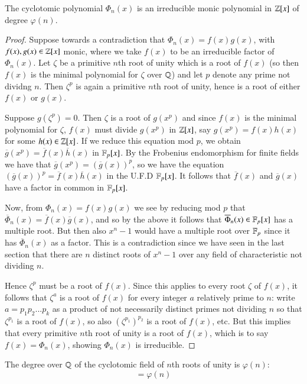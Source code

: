 \begin{theorem}
    The cyclotomic polynomial $\Phi_n(x)$ is an irreducible monic polynomial in $\mathbb Z[x]$ of degree $\varphi(n)$.
\end{theorem}
\begin{proof}
    Suppose towards a contradiction that $\Phi_n(x) = f(x)g(x)$, with $f(x),g(x) \in \mathbb Z[x]$ monic, where we take $f(x)$ to be an irreducible factor of $\Phi_n(x)$. Let $\zeta$ be a primitive $n$th root of unity which is a root of $f(x)$ (so then $f(x)$ is the minimal polynomial for $\zeta$ over $\mathbb Q$) and let $p$ denote any prime not dividng $n$. Then $\zeta^p$ is again a primitive $n$th root of unity, hence is a root of either $f(x)$ or $g(x)$.


    Suppose $g(\zeta^p) = 0$. Then $\zeta$ is a root of $g(x^p)$ and since $f(x)$ is the minimal polynomial for $\zeta$, $f(x)$ must divide $g(x^p)$ in $\mathbb Z[x]$, say $g(x^p) = f(x)h(x)$ for some $h(x) \in \mathbb Z[x]$. If we reduce this equation mod $p$, we obtain $\overline{g}(x^p) = \overline{f}(x)\overline{h}(x)$ in $\mathbb F_p[x]$. By the Frobenius endomorphism for finite fields we have that $\overline{g}(x^p) = (\overline{g}(x))^p$, so we have the equation $(\overline{g}(x))^p = \overline{f}(x)\overline{h}(x)$ in the U.F.D $\mathbb F_p[x]$. It follows that $\overline{f}(x)$ and $\overline{g}(x)$ have a factor in common in $\mathbb F_p[x]$. 

    Now, from $\Phi_n(x) = f(x)g(x)$ we see by reducing mod $p$ that $\overline{\Phi}_n(x) = \overline{f}(x)\overline{g}(x)$, and so by the above it follows that $\overline{\Phi}_n(x) \in \mathbb F_p[x]$ has a multiple root. But then also $x^n-1$ would have a multiple root over $\mathbb F_p$ since it has $\overline{\Phi}_n(x)$ as a factor. This is a contradiction since we have seen in the last section that there are $n$ distinct roots of $x^n-1$ over any field of characteristic not dividing $n$. 

    Hence $\zeta^p$ must be a root of $f(x)$. Since this applies to every root $\zeta$ of $f(x)$, it follows that $\zeta^a$ is a root of $f(x)$ for every integer $a$ relatively prime to $n$: write $a = p_1p_2...p_k$ as a product of not necessarily distinct primes not dividing $n$ so that $\zeta^{p_1}$ is a root of $f(x)$, so also $(\zeta^{p_1})^{p_2}$ is a root of $f(x)$, etc. But this implies that every primitive $n$th root of unity is a root of $f(x)$, which is to say $f(x) = \Phi_n(x)$, showing $\Phi_n(x)$ is irreducible.
\end{proof}



\begin{corollary}
    The degree over $\mathbb Q$ of the cyclotomic field of $n$th roots of unity is $\varphi(n)$: \begin{equation*}
        [\Q(\zeta_n):\Q] = \varphi(n)
    \end{equation*}
\end{corollary}



